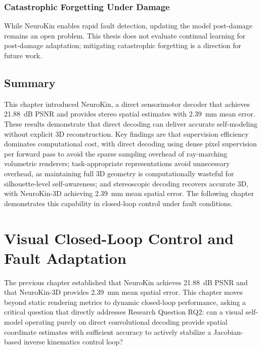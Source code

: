 \documentclass[12pt,a4paper,oneside]{report}
\begin{document}
\subsection{Catastrophic Forgetting Under Damage}
\label{subsec:catastrophic_forgetting_under_damage}

While NeuroKin enables rapid fault detection, updating the model post-damage remains an open problem. This thesis does not evaluate continual learning for post-damage adaptation; mitigating catastrophic forgetting is a direction for future work.
\section{Summary}

This chapter introduced NeuroKin, a direct sensorimotor decoder that achieves 21.88~dB PSNR and provides stereo spatial estimates with 2.39~mm mean error. These results demonstrate that direct decoding can deliver accurate self-modeling without explicit 3D reconstruction. Key findings are that supervision efficiency dominates computational cost, with direct decoding using dense pixel supervision per forward pass to avoid the sparse sampling overhead of ray-marching volumetric renderers; task-appropriate representations avoid unnecessary overhead, as maintaining full 3D geometry is computationally wasteful for silhouette-level self-awareness; and stereoscopic decoding recovers accurate 3D, with NeuroKin-3D achieving 2.39~mm mean spatial error. The following chapter demonstrates this capability in closed-loop control under fault conditions.
\clearpage


\chapter{Visual Closed-Loop Control and Fault Adaptation}
\label{chap:closed_loop_fault_adaptation}

The previous chapter established that NeuroKin achieves 21.88~dB PSNR and that NeuroKin-3D provides 2.39~mm mean spatial error. This chapter moves beyond static rendering metrics to dynamic closed-loop performance, asking a critical question that directly addresses Research Question RQ2: can a visual self-model operating purely on direct convolutional decoding provide spatial coordinate estimates with sufficient accuracy to actively stabilize a Jacobian-based inverse kinematics control loop?
\end{document}

